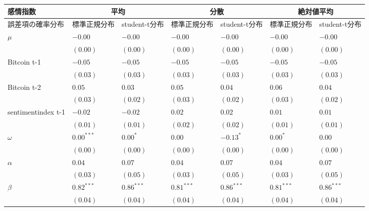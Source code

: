 \begin{landscape}
\begin{table}[]
\begin{tabular}{lllllll}
\hline
感情指数               & \multicolumn{2}{c}{平均}      & \multicolumn{2}{c}{分散}      & \multicolumn{2}{c}{絶対値平均}   \\ \hline
誤差項の確率分布           & 標準正規分布       & student-t分布  & 標準正規分布       & student-t分布  & 標準正規分布       & student-t分布  \\ \hline
$\mu$              & $-0.00$      & $-0.00$      & $-0.00$      & $-0.00$      & $-0.00$      & $-0.00$      \\
                   & $(0.00)$     & $(0.00)$     & $(0.00)$     & $(0.00)$     & $(0.00)$     & $(0.00)$     \\
Bitcoin t-1        & $-0.05$      & $-0.05$      & $-0.05$      & $-0.05$      & $-0.05$      & $-0.05$      \\
                   & $(0.03)$     & $(0.03)$     & $(0.03)$     & $(0.03)$     & $(0.03)$     & $(0.03)$     \\
Bitcoin t-2        & $0.05$       & $0.03$       & $0.05$       & $0.04$       & $0.06$       & $0.04$       \\
                   & $(0.03)$     & $(0.02)$     & $(0.03)$     & $(0.02)$     & $(0.03)$     & $(0.02)$     \\
sentimentindex t-1 & $-0.02$      & $-0.02$      & $0.02$       & $0.02$       & $0.01$       & $0.01$       \\
                   & $(0.01)$     & $(0.01)$     & $(0.02)$     & $(0.02)$     & $(0.01)$     & $(0.01)$     \\
$\omega$           & $0.00^{***}$ & $0.00^{*}$   & $0.00$       & $-0.13^{*}$  & $0.00^{*}$   & $0.00$       \\
                   & $(0.00)$     & $(0.00)$     & $(0.00)$     & $(0.00)$     & $(0.00)$     & $(0.00)$     \\
$\alpha$           & $0.04$       & $0.07$       & $0.04$       & $0.07$       & $0.04$       & $0.07$       \\
                   & $(0.03)$     & $(0.05)$     & $(0.03)$     & $(0.05)$     & $(0.03)$     & $(0.05)$     \\
$\beta$            & $0.82^{***}$ & $0.86^{***}$ & $0.81^{***}$ & $0.86^{***}$ & $0.81^{***}$ & $0.86^{***}$ \\
                   & $(0.04)$     & $(0.04)$     & $(0.04)$     & $(0.04)$     & $(0.04)$     & $(0.04)$     \\

\end{tabular}
\end{table}
\end{landscape}
